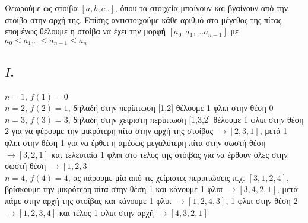 \documentclass[14pt,fleqn]{extarticle}
\begin{document}
\section*{}
\begin{adjustwidth}{2em}{0pt}
Θεωρούμε ως στοίβα $[a,b,c..]$, όπου τα στοιχεία μπαίνουν και βγαίνουν από την στοίβα στην αρχή της. Επίσης αντιστοιχούμε κάθε αριθμό στο μέγεθος της πίτας επομένως θέλουμε η στοίβα να έχει την μορφή $[a_0,a_1,...a_{n-1}]$ με $a_{0}\leq a_{1}\dots\leq a_{n-1}\leq a_n$
\subsection*{$I$.}
\begin{adjustwidth}{3em}{0pt}
\begin{itemize}
 $n=1$, $f(1) = 0$\\
 $n=2$, $f(2) = 1$, δηλαδή στην περίπτωση [1,2] θέλουμε 1 φλιπ στην θέση 0\\
 $n=3$, $f(3) = 3$, δηλαδή στην χείριστη περίπτωση [1,3,2] θέλουμε 1 φλιπ στην θέση 2 για να φέρουμε την μικρότερη πίτα στην αρχή της στοίβας $\rightarrow [2,3,1]$, μετά 1 φλιπ στην θέση 1 για να έρθει η αμέσως μεγαλύτερη πίτα στην σωστή θέση $\rightarrow [3,2,1]$ και τελευταία 1 φλιπ στο τέλος της στόιβας για να έρθουν όλες στην σωστή θέση  $\rightarrow
[1,2,3]$\\
 $n=4$, $f(4) = 4$, ας πάρουμε μία από τις χείριστες περιπτώσεις π.χ. $[3,1,2,4]$, βρίσκουμε την μικρότερη πίτα στην θέση 1 και κάνουμε 1 φλιπ $\rightarrow[3,4,2,1]$, μετά πάμε στην αρχή της στοίβας και κάνουμε 1 φλιπ $\rightarrow[1,2,4,3]$, 1 φλιπ στην θέση 2 $\rightarrow[1,2,3,4]$ και τέλος 1 φλιπ στην αρχή $\rightarrow[4,3,2,1]$
\end{itemize}
\end{adjustwidth}

\end{adjustwidth}
\end{document}
